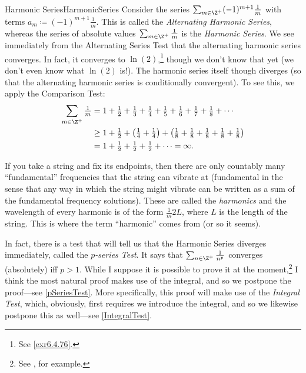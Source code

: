 \begin{exm}{Harmonic Series}{HarmonicSeries}
Consider the series $\sum _{m\in \Z ^+}(-1)^{m+1}\frac{1}{m}$ with terms $a_m\coloneqq (-1)^{m+1}\frac{1}{m}$.  This is called the \emph{Alternating Harmonic Series}, whereas the series of absolute values $\sum _{m\in \Z ^+}\frac{1}{m}$ is the \emph{Harmonic Series}.  We see immediately from the Alternating Series Test that the alternating harmonic series converges.  In fact, it converges to $\ln (2)$,\footnote{See \cref{exr6.4.76}.} though we don't know that yet (we don't even know what $\ln (2)$ is!).  The harmonic series itself though diverges (so that the alternating harmonic series is conditionally convergent).  To see this, we apply the Comparison Test:
\begin{equation}
\begin{split}
\sum _{m\in \Z ^+}\tfrac{1}{m} & =1+\tfrac{1}{2}+\tfrac{1}{3}+\tfrac{1}{4}+\tfrac{1}{5}+\tfrac{1}{6}+\tfrac{1}{7}+\tfrac{1}{8}+\cdots \\
& \geq 1+\tfrac{1}{2}+\left( \tfrac{1}{4}+\tfrac{1}{4}\right) +\left( \tfrac{1}{8}+\tfrac{1}{8}+\tfrac{1}{8}+\tfrac{1}{8}+\tfrac{1}{8}\right) \\
& =1+\tfrac{1}{2}+\tfrac{1}{2}+\tfrac{1}{2}+\cdots =\infty .
\end{split}
\end{equation}
\begin{rmk}
If you take a string and fix its endpoints, then there are only countably many ``fundamental'' frequencies that the string can vibrate at (fundamental in the sense that any way in which the string might vibrate can be written as a sum of the fundamental frequency solutions).  These are called the \emph{harmonics} and the wavelength of every harmonic is of the form $\frac{1}{m}2L$, where $L$ is the length of the string.  This is where the term ``harmonic'' comes from (or so it seems).
\end{rmk}
\end{exm}
In fact, there is a test that will tell us that the Harmonic Series diverges immediately, called the \emph{$p$-series Test}.  It says that $\sum _{n\in \Z ^+}\frac{1}{n^p}$ converges (absolutely) iff $p>1$.  While I suppose it is possible to prove it at the moment,\footnote{See \cite{Yang}, for example.} I think the most natural proof makes use of the integral, and so we postpone the proof---see \cref{pSeriesTest}.  More specifically, this proof will make use of the \emph{Integral Test}, which, obviously, first requires we introduce the integral, and so we likewise postpone this as well---see \cref{IntegralTest}.

